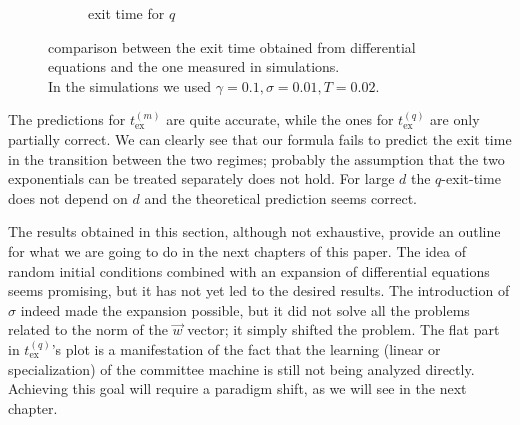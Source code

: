 \begin{figure}
\begin{subfigure}{0.495\textwidth}
    \caption{exit time for \(q\)}
  \end{subfigure}
  \caption{
    comparison between the exit time obtained from differential equations and the one measured in simulations. \\
    In the simulations we used \(\gamma=\num{0.1}, \sigma=\num{0.01}, T=\num{0.02}\).
  }
  \label{fig:sigma-phase-retrieval-exittimes}
\end{figure}
The predictions for \(t_\text{ex}^{(m)}\) are quite accurate,
while the ones for \(t_\text{ex}^{(q)}\) are only partially correct.
We can clearly see that our formula fails to predict the exit time in the transition
between the two regimes; probably the assumption that the two exponentials can be treated separately does not hold.
For large \(d\) the \(q\)-exit-time does not depend on \(d\) and the theoretical prediction seems correct.

The results obtained in this section, although not exhaustive,
provide an outline for what we are going to do in the next chapters of this paper.
The idea of random initial conditions combined with an expansion of differential equations seems promising,
but it has not yet led to the desired results.
The introduction of \(\sigma\) indeed made the expansion possible,
but it did not solve all the problems related to the norm of the \(\vec{w}\) vector;
it simply shifted the problem. 
The flat part in \(t_\text{ex}^{(q)}\)'s plot is a manifestation of the fact that the learning (linear or specialization) of the committee machine is still not being analyzed directly.
Achieving this goal will require a paradigm shift, as we will see in the next chapter.
